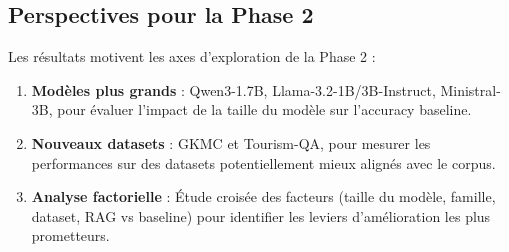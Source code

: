 \documentclass[12pt,a4paper]{article}
\begin{document}
\subsection{Perspectives pour la Phase 2}

Les résultats motivent les axes d'exploration de la Phase 2 :

\begin{enumerate}[leftmargin=*]
  \item \textbf{Modèles plus grands} : Qwen3-1.7B, Llama-3.2-1B/3B-Instruct, Ministral-3B, pour évaluer l'impact de la taille du modèle sur l'accuracy baseline.

  \item \textbf{Nouveaux datasets} : GKMC et Tourism-QA, pour mesurer les performances sur des datasets potentiellement mieux alignés avec le corpus.

  \item \textbf{Analyse factorielle} : Étude croisée des facteurs (taille du modèle, famille, dataset, RAG vs baseline) pour identifier les leviers d'amélioration les plus prometteurs.
\end{enumerate}

\newpage


\end{document}
